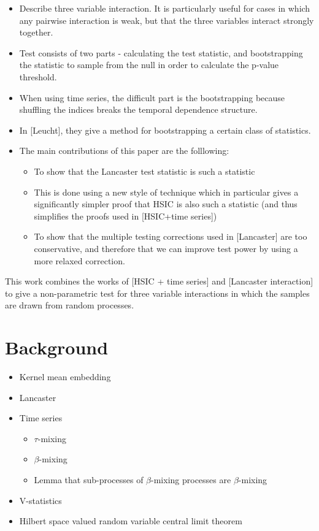 \documentclass{article}
\begin{document}
\begin{itemize}
\item Describe three variable interaction. It is particularly useful for cases in which any pairwise interaction is weak, but that the three variables interact strongly together.
\item Test consists of two parts - calculating the test statistic, and bootstrapping the statistic to sample from the null in order to calculate the p-value threshold.
\item When using time series, the difficult part is the bootstrapping because shuffling the indices breaks the temporal dependence structure.
\item In [Leucht], they give a method for bootstrapping a certain class of statistics.
\item The main contributions of this paper are the folllowing:
\begin{itemize}
\item To show that the Lancaster test statistic is such a statistic
\item This is done using a new style of technique which in particular gives a significantly simpler proof that HSIC is also such a statistic (and thus simplifies the proofs used in [HSIC+time series])
\item To show that the multiple testing corrections used in [Lancaster] are too conservative, and therefore that we can improve test power by using a more relaxed correction.
\end{itemize}
\end{itemize}


This work combines the works of [HSIC + time series] and [Lancaster interaction] to give a non-parametric test for three variable interactions in which the samples are drawn from random processes.

\section{Background} 

\begin{itemize}
\item Kernel mean embedding
\item Lancaster
\item Time series
\begin{itemize}
\item $\tau$-mixing
\item $\beta$-mixing
\item Lemma that sub-processes of $\beta$-mixing processes are $\beta$-mixing
\end{itemize}
\item V-statistics
\item Hilbert space valued random variable central limit theorem
\end{itemize} 
\end{document}
